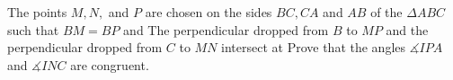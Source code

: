 The points $M, N,$ and $P$ are chosen on the sides $BC, CA$ and $AB$ of the $\Delta ABC$ such that $BM=BP$ and  The perpendicular dropped from $B$ to $MP$ and the perpendicular dropped from $C$ to $MN$ intersect at  Prove that the angles $\measuredangle{IPA}$ and $\measuredangle{INC}$ are congruent.